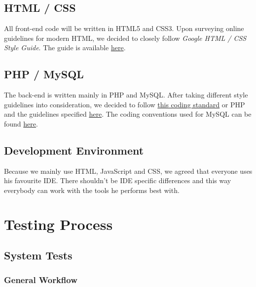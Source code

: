 \documentclass[twoside,12pt,a4paper]{article}
\begin{document}
\subsection{HTML / CSS} %
\label{sub:htmlcss}

All front-end code will be written in HTML5 and CSS3. Upon surveying online guidelines for modern HTML, we decided to closely follow \textit{Google HTML / CSS Style Guide}. The guide is available \href{https://google-styleguide.googlecode.com/svn/trunk/htmlcssguide.xml}{here}.

\subsection{PHP / MySQL} %
\label{sub:phpmysql}

The back-end is written mainly in PHP and MySQL. After taking different style guidelines into consideration, we decided to follow \href{http://www.php-fig.org/psr/psr-1/}{this coding standard} or PHP and the guidelines specified \href{http://www.php-fig.org/psr/psr-2/}{here}. The coding conventions used for MySQL can be found \href{https://www.drupal.org/node/2497}{here}.

\subsection{Development Environment}
Because we mainly use HTML, JavaScript and CSS, we agreed that everyone uses his favourite IDE. There shouldn't be IDE specific differences and this way everybody can work with the tools he performs best with.

\newpage

\section{Testing Process} %
\label{sec:testing_process}

\subsection{System Tests}
\subsubsection{General Workflow} %
\label{sub:general_workflow}
\end{document}
